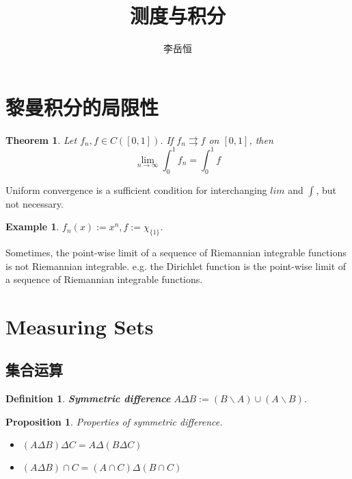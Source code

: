 \documentclass{book}
\newtheorem{definition}{Definition}
\newtheorem{theorem}{Theorem}
\newtheorem{proposition}{Proposition}
\newtheorem{example}{Example}
\begin{document}
\begin{CJK}{UTF8}{gbsn}

\title{测度与积分}
\author{李岳恒}
\maketitle

\tableofcontents
\setcounter{section}{-1}


\section{黎曼积分的局限性}


\begin{theorem}
	Let $f_n,f \in C([0,1])$. If $f_n \rightrightarrows f$ on $[0,1]$, then 
	$$\lim_{n\rightarrow \infty}\int_0^1f_n=\int_0^1 f$$
\end{theorem}

Uniform convergence is a sufficient condition for interchanging $lim$ and $\int$, but not necessary.

\begin{example}
	$f_n(x):=x^n,f:=\chi_{\{1\}}$.
\end{example}

Sometimes, the point-wise limit of a sequence of  Riemannian integrable functions is not Riemannian integrable. e.g. the Dirichlet function is the point-wise limit of a sequence of Riemannian integrable functions.







\section{Measuring Sets}

\subsection{集合运算}
\begin{definition}
	\textbf{Symmetric difference} $A\Delta B:=(B\backslash A)\cup (A \backslash B).$
\end{definition}

\begin{proposition}\label{symmetric difference}
Properties of symmetric difference.\par 
\begin{itemize}
	\item $(A\Delta B)\Delta C = A\Delta (B\Delta C)$
	\item $(A\Delta B)\cap C=(A\cap C)\Delta (B\cap C)$
\end{itemize}
\end{proposition}



\end{CJK}
\end{document}
